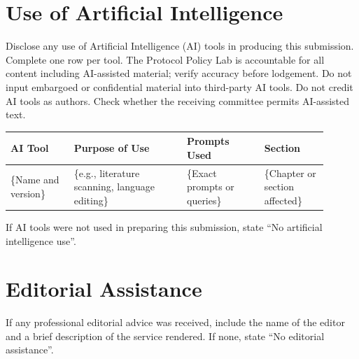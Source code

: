 \section{Use of Artificial Intelligence}

\begin{instructional}
Disclose any use of Artificial Intelligence (AI) tools in producing this submission. Complete one row per tool. The Protocol Policy Lab is accountable for all content including AI-assisted material; verify accuracy before lodgement. Do not input embargoed or confidential material into third-party AI tools. Do not credit AI tools as authors. Check whether the receiving committee permits AI-assisted text.
\end{instructional}

\begin{table}[ht]
    \centering
    \begin{tabular}{|p{0.18\linewidth}|p{0.32\linewidth}|p{0.22\linewidth}|p{0.18\linewidth}|}
        \hline
        AI Tool                         & Purpose of Use                                         & Prompts Used                                       & Section                                         \\ \hline
        \{Name and version\}            & \{e.g., literature scanning, language editing\}        & \{Exact prompts or queries\}                       & \{Chapter or section affected\}                 \\
        \hline
    \end{tabular}
\end{table}

\begin{instructional}
If AI tools were not used in preparing this submission, state ``No artificial intelligence use''.
\end{instructional}


\section{Editorial Assistance}

\begin{instructional}
If any professional editorial advice was received, include the name of the editor and a brief description of the service rendered. If none, state ``No editorial assistance''.
\end{instructional}


